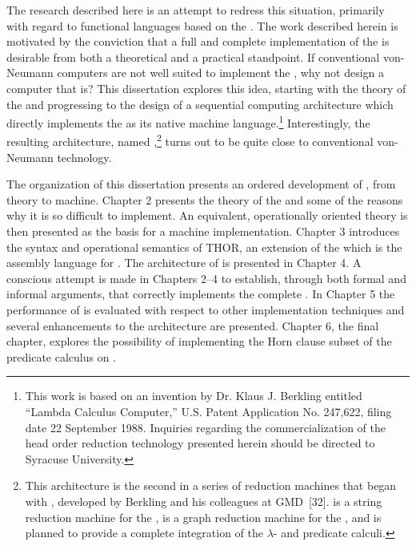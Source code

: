 The research described here is an attempt to redress this situation, primarily
with regard to functional languages based on the \lambdacalculus. The work
described herein is motivated by the conviction that a full and complete
implementation of the \lambdabetacalculus{} is desirable from both a theoretical
and a practical standpoint. If conventional von-Neumann computers are not well
suited to implement the \lambdacalculus, why not design a computer that is? This
dissertation explores this idea, starting with the theory of the
\lambdacalculus{} and progressing to the design of a sequential computing
architecture which directly implements the \lambdabetacalculus{} as its native
machine language.\footnote{This work is based on an invention by Dr. Klaus J.
Berkling entitled ``Lambda Calculus Computer,'' U.S. Patent Application No.
247,622, filing date 22 September 1988. Inquiries regarding the
commercialization of the head order reduction technology presented herein should
be directed to Syracuse University.} Interestingly, the resulting architecture,
named ,\footnote{This architecture is the second in a series of reduction
machines that began with , developed by Berkling and his colleagues at
GMD~[32].  is a string reduction machine for the \lambdacalculus,
 is a graph reduction machine for the \lambdacalculus, and  is
planned to provide a complete integration of the \ensuremath{\lambda}- and
predicate calculi.} turns out to be quite close to conventional von-Neumann
technology.

The organization of this dissertation presents an ordered development of
, from theory to machine. Chapter 2 presents the theory of the
\lambdacalculus{} and some of the reasons why it is so difficult to implement.
An equivalent, operationally oriented theory is then presented as the basis for a
machine implementation. Chapter 3 introduces the syntax and operational semantics
of THOR, an extension of the \lambdacalculus{} which is the assembly language
for . The architecture of  is presented in Chapter 4. A conscious
attempt is made in Chapters 2--4 to establish, through both formal and informal
arguments, that  correctly implements the complete
\lambdabetacalculus. In Chapter 5 the performance of  is evaluated with
respect to other implementation techniques and several enhancements to the
architecture are presented. Chapter 6, the final chapter, explores the
possibility of implementing the Horn clause subset of the predicate calculus on
.
